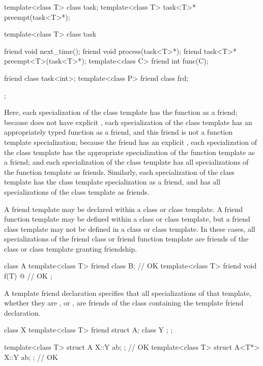 \begin{example}
\begin{codeblock}
template<class T> class task;
template<class T> task<T>* preempt(task<T>*);

template<class T> class task {
  friend void next_time();
  friend void process(task<T>*);
  friend task<T>* preempt<T>(task<T>*);
  template<class C> friend int func(C);

  friend class task<int>;
  template<class P> friend class frd;
};
\end{codeblock}

Here,
each specialization of the
class template has the function
as a friend;
because
does not have explicit
,
each specialization of the
class template has an appropriately typed function
as a friend, and this friend is not a function template specialization;
because the friend
has an explicit
,
each specialization of the
class template has the appropriate specialization of the function
template
as a friend;
and each specialization of the
class template has all specializations of the function template
as friends.
Similarly,
each specialization of the
class template has the class template specialization
as a friend, and has all specializations of the class template
as friends.
\end{example}

\pnum
A friend template may be declared within a class or class template.
A friend function template may be defined within a class or class
template, but a friend class template may not be defined in a class
or class template.
In these cases, all specializations of the friend class or friend function
template are friends of the class or class template granting friendship.
\begin{example}
\begin{codeblock}
class A {
  template<class T> friend class B;                 // OK
  template<class T> friend void f(T){ @\commentellip@ }   // OK
};
\end{codeblock}
\end{example}

\pnum
A template friend declaration specifies that all specializations of that
template, whether they are ,  or ,
are friends of the class containing the template friend declaration.
\begin{example}
\begin{codeblock}
class X {
  template<class T> friend struct A;
  class Y { };
};

template<class T> struct A { X::Y ab; };            // OK
template<class T> struct A<T*> { X::Y ab; };        // OK
\end{codeblock}
\end{example}

